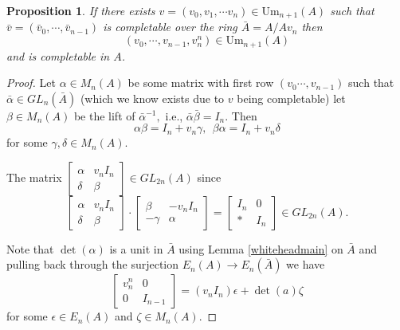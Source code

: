 \documentclass[12pt]{report}
\numberwithin{equation}{section}
\newcounter{dummy} \numberwithin{dummy}{section}
\newtheorem{proposition}[dummy]{Proposition}
\begin{document}
	
%	
	\begin{proposition} If there exists $v=(v_0, v_1, \cdots v_n) \in \mathrm{Um}_{n+1}(A)$ such that $\bar{v}=(\bar{v}_0, \cdots, \bar{v}_{n-1})$ is completable over the ring $\bar{A}=A/Av_n$ then $$(v_0,\cdots, v_{n-1} ,v_n^n) \in \mathrm{Um}_{n+1}(A)$$ and is completable in $A$.
		
	\end{proposition}
	\begin{proof}
		Let $\alpha \in M_{n}(A)$ be some matrix with first row $(v_0 \cdots, v_{n-1})$ such that $\bar{\alpha} \in GL_{n}(\bar{A})$ (which we know exists due to $v$ being completable) let $\beta \in M_{n}(A)$ be the lift of $\bar{\alpha}^{-1},$ i.e., $\bar{\alpha}\bar{\beta} = I_{n}$. Then $$\alpha \beta= I_n+v_n \gamma, \ \ \beta \alpha=I_n+v_n \delta$$ for some $\gamma,\delta \in M_{n}(A)$.
		
		The matrix $\begin{bmatrix}
			\alpha & v_n I_{n}\\
			\delta & \beta 
		\end{bmatrix} \in GL_{2n}(A)$ since $$\begin{bmatrix}
		\alpha & v_n I_n\\ \delta & \beta 
		\end{bmatrix} \cdot \begin{bmatrix}
		\beta & -v_n I_n \\ -\gamma & \alpha 
		\end{bmatrix} = \begin{bmatrix}
		I_n & 0 \\ * & I_n
		\end{bmatrix} \in GL_{2n}(A).$$ 
		
		Note that $\det(\alpha)$ is a unit in $\bar{A}$ using Lemma \ref{whiteheadmain} on $\bar{A}$ and pulling back through the surjection $E_n(A) \to E_n(\bar{A})$ we have $$\begin{bmatrix}
			v_n^n & 0 \\ 0 & I_{n-1}
		\end{bmatrix} = (v_n I_n) \epsilon + \det(a) \zeta $$ for some $\epsilon \in E_n(A)$ and $\zeta  \in M_n(A)$.
		

\end{proof}
\end{document}
